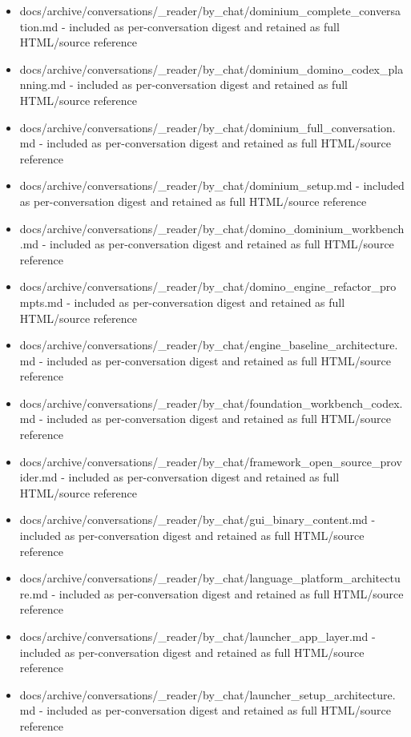\documentclass[11pt,a4paper]{report}
\begin{document}
\begin{itemize}
\item docs/archive/conversations/\_reader/by\_chat/dominium\_complete\_conversation.md - included as per-conversation digest and retained as full HTML/source reference
\item docs/archive/conversations/\_reader/by\_chat/dominium\_domino\_codex\_planning.md - included as per-conversation digest and retained as full HTML/source reference
\item docs/archive/conversations/\_reader/by\_chat/dominium\_full\_conversation.md - included as per-conversation digest and retained as full HTML/source reference
\item docs/archive/conversations/\_reader/by\_chat/dominium\_setup.md - included as per-conversation digest and retained as full HTML/source reference
\item docs/archive/conversations/\_reader/by\_chat/domino\_dominium\_workbench.md - included as per-conversation digest and retained as full HTML/source reference
\item docs/archive/conversations/\_reader/by\_chat/domino\_engine\_refactor\_prompts.md - included as per-conversation digest and retained as full HTML/source reference
\item docs/archive/conversations/\_reader/by\_chat/engine\_baseline\_architecture.md - included as per-conversation digest and retained as full HTML/source reference
\item docs/archive/conversations/\_reader/by\_chat/foundation\_workbench\_codex.md - included as per-conversation digest and retained as full HTML/source reference
\item docs/archive/conversations/\_reader/by\_chat/framework\_open\_source\_provider.md - included as per-conversation digest and retained as full HTML/source reference
\item docs/archive/conversations/\_reader/by\_chat/gui\_binary\_content.md - included as per-conversation digest and retained as full HTML/source reference
\item docs/archive/conversations/\_reader/by\_chat/language\_platform\_architecture.md - included as per-conversation digest and retained as full HTML/source reference
\item docs/archive/conversations/\_reader/by\_chat/launcher\_app\_layer.md - included as per-conversation digest and retained as full HTML/source reference
\item docs/archive/conversations/\_reader/by\_chat/launcher\_setup\_architecture.md - included as per-conversation digest and retained as full HTML/source reference

\end{itemize}
\end{document}
